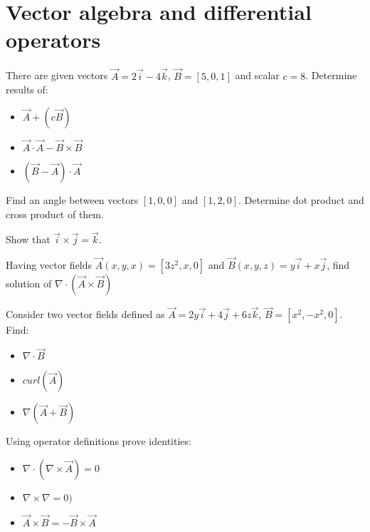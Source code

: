 \section{Vector algebra and differential operators}

\begin{Exercise}[difficulty=1]
There are given vectors $\vec A = 2 \vec{i} - 4\vec{k}$, $\vec B = [5, 0, 1]$ and scalar $c = 8$. Determine results of:

\begin{itemize}
\item $\vec A + (c \vec B)$
\item $\vec A \cdot \vec A - \vec B \times \vec B$
\item $(\vec B - \vec A) \cdot \vec A$
\end{itemize}

\end{Exercise}


\begin{Exercise}[difficulty=1]
Find an angle between vectors $[1,0,0]$ and $[1,2,0]$. Determine dot product and cross product of them.
\end{Exercise}


\begin{Exercise}[difficulty=1]
Show that $\vec{i}\times\vec{j} = \vec{k}$.
\end{Exercise}


\begin{Exercise}[difficulty=2]
Having vector fields $\vec A (x,y,x) = [3z^2, x, 0]$ and $\vec B (x,y,z) = y\vec{i} + x\vec{j}$, find solution of $\nabla \cdot (\vec A \times \vec{B})$
\end{Exercise}

\begin{Exercise}[difficulty=2]
Consider two vector fields defined as $\vec{A} = 2y\vec{i}+4\vec{j}+6z\vec{k}$, $\vec{B} = [ x^2, -x^2, 0]$. Find:
\begin{itemize}
\item $ \nabla \cdot \vec{B} $
\item $ {curl}( \vec A )$
\item $ \nabla ( \vec A + \vec B )$
\end{itemize}
\end{Exercise}

\begin{Exercise}[difficulty=2]
Using operator definitions prove identities:
\begin{itemize}
\item $ \nabla \cdot (\nabla \times \vec{A}) = 0$
\item $ \nabla \times \nabla = 0 )$
\item $ \vec{A} \times \vec{B} = - \vec{B} \times \vec{A} $
\end{itemize}
\end{Exercise}
